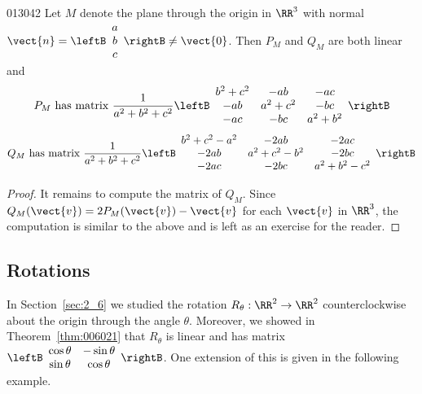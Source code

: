 \begin{theorem}{}{013042}
Let $M$ denote the plane through the origin in $\RR^3$ with normal $\vect{n} = \leftB
\begin{array}{c}
a \\
b \\
c
\end{array}
\rightB \neq \vect{0}$. Then $P_{M}$ and $Q_{M}$ are both linear and
\begin{equation*}
P_{M} \mbox{ has matrix }\frac{1}{a^2 + b^2 + c^2} \leftB
\begin{array}{ccc}
b^2 + c^2 & -ab & -ac \\
-ab & a^2 + c^2 & -bc \\
-ac & -bc & a^2 + b^2  
\end{array}
\rightB
\end{equation*}
\begin{equation*}
Q_{M} \mbox{ has matrix }\frac{1}{a^2 + b^2 + c^2} \leftB
\begin{array}{ccc}
b^2 + c^2 - a^2 & -2ab & -2ac \\
-2ab & a^2 + c^2 - b^2 & -2bc \\
-2ac & -2bc & a^2 + b^2 - c^2
\end{array}
\rightB
\end{equation*}
\end{theorem}

\begin{proof}
It remains to compute the matrix of $Q_{M}$. Since $Q_{M}(\vect{v}) = 2P_{M}(\vect{v}) - \vect{v}$ for each $\vect{v}$ in $\RR^3$, the computation is similar to the above and is left as an exercise for the reader.
\end{proof}

\subsection*{Rotations}

In Section~\ref{sec:2_6} we studied the rotation $R_{\theta} : \RR^2 \to \RR^2$ counterclockwise about the origin through the angle $\theta$. Moreover, we showed in Theorem~\ref{thm:006021} that $R_{\theta}$ is linear and has matrix $\leftB
\begin{array}{cc}
\cos\theta & -\sin\theta \\
\sin\theta & \cos\theta
\end{array}
\rightB$. One extension of this is given in the following example.



